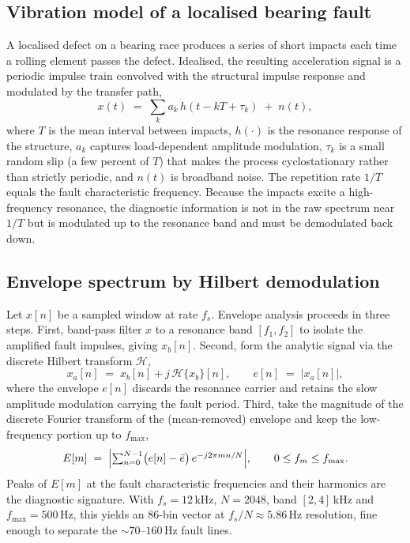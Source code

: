 \documentclass[11pt]{article}
\begin{document}
\subsection{Vibration model of a localised bearing fault}
A localised defect on a bearing race produces a series of short impacts each time a
rolling element passes the defect. Idealised, the resulting acceleration signal is a
periodic impulse train convolved with the structural impulse response and modulated by
the transfer path,
\begin{equation}
x(t) \;=\; \sum_{k} a_k\, h(t - kT + \tau_k) \;+\; n(t),
\end{equation}
where $T$ is the mean interval between impacts, $h(\cdot)$ is the resonance response of the
structure, $a_k$ captures load-dependent amplitude modulation, $\tau_k$ is a small random
slip (a few percent of $T$) that makes the process cyclostationary rather than strictly
periodic, and $n(t)$ is broadband noise. The repetition rate $1/T$ equals the fault
characteristic frequency. Because the impacts excite a high-frequency resonance, the
diagnostic information is not in the raw spectrum near $1/T$ but is modulated up to the
resonance band and must be demodulated back down.

\subsection{Envelope spectrum by Hilbert demodulation}
Let $x[n]$ be a sampled window at rate $f_s$. Envelope analysis proceeds in three steps.
First, band-pass filter $x$ to a resonance band $[f_1,f_2]$ to isolate the amplified fault
impulses, giving $x_b[n]$. Second, form the analytic signal via the discrete Hilbert
transform $\mathcal{H}$,
\begin{equation}
x_a[n] \;=\; x_b[n] + j\,\mathcal{H}\{x_b\}[n],
\qquad
e[n] \;=\; \lvert x_a[n]\rvert,
\end{equation}
where the envelope $e[n]$ discards the resonance carrier and retains the slow amplitude
modulation carrying the fault period. Third, take the magnitude of the discrete Fourier
transform of the (mean-removed) envelope and keep the low-frequency portion up to $f_{\max}$,
\begin{equation}
E[m] \;=\; \Bigl\lvert \textstyle\sum_{n=0}^{N-1} \bigl(e[n]-\bar e\bigr)\, e^{-j 2\pi m n / N} \Bigr\rvert,
\qquad 0 \le f_m \le f_{\max}.
\end{equation}
Peaks of $E[m]$ at the fault characteristic frequencies and their harmonics are the
diagnostic signature. With $f_s=12$\,kHz, $N=2048$, band $[2,4]$\,kHz and $f_{\max}=500$\,Hz,
this yields an 86-bin vector at $f_s/N \approx 5.86$\,Hz resolution, fine enough to
separate the $\sim70$--$160$\,Hz fault lines.
\end{document}
